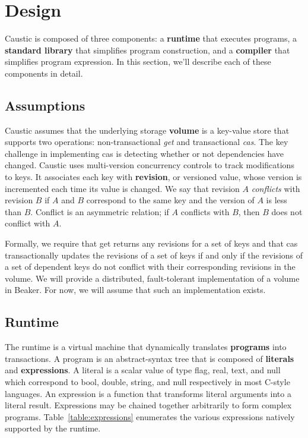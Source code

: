 \documentclass[../main.tex]{subfiles}
\begin{document}
\section{Design}
Caustic is composed of three components: a \textbf{runtime} that executes programs, a
\textbf{standard library} that simplifies program construction, and a \textbf{compiler} that
simplifies program expression. In this section, we'll describe each of these components in detail.

  \subsection{Assumptions}
  Caustic assumes that the underlying storage \textbf{volume} is a key-value store that supports two
  operations: non-transactional \emph{get} and transactional \emph{cas}. The key challenge in
  implementing cas is detecting whether or not dependencies have changed. Caustic uses multi-version
  concurrency controls to track modifications to keys. It associates each key with
  \textbf{revision}, or versioned value, whose version is incremented each time its value is
  changed. We say that revision $A$ \emph{conflicts} with revision $B$ if $A$ and $B$ correspond to
  the same key and the version of $A$ is less than $B$. Conflict is an asymmetric relation; if $A$
  conflicts with $B$, then $B$ does not conflict with $A$.

  Formally, we require that get returns any revisions for a set of keys and that cas transactionally
  updates the revisions of a set of keys if and only if the revisions of a set of dependent keys do
  not conflict with their corresponding revisions in the volume. We will provide a distributed,
  fault-tolerant implementation of a volume in Beaker. For now, we will assume that such an
  implementation exists.

  \subsection{Runtime}
  The runtime is a virtual machine that dynamically translates \textbf{programs} into transactions.
  A program is an abstract-syntax tree that is composed of \textbf{literals} and
  \textbf{expressions}. A literal is a scalar value of type flag, real, text, and null which
  correspond to bool, double, string, and null respectively in most C-style languages. An expression
  is a function that transforms literal arguments into a literal result. Expressions may be chained
  together arbitrarily to form complex programs. Table~\ref{table:expressions} enumerates the
  various expressions natively supported by the runtime.
\end{document}
